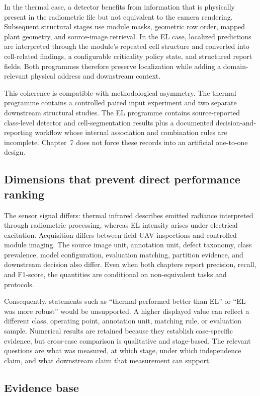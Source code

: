 \documentclass[12pt,a4paper]{report}
\begin{document}
In the thermal case, a detector benefits from information that is physically present in the radiometric file but not equivalent to the camera rendering. Subsequent structural stages use module masks, geometric row order, mapped plant geometry, and source-image retrieval. In the EL case, localized predictions are interpreted through the module's repeated cell structure and converted into cell-related findings, a configurable criticality policy state, and structured report fields. Both programmes therefore preserve localization while adding a domain-relevant physical address and downstream context.

This coherence is compatible with methodological asymmetry. The thermal programme contains a controlled paired input experiment and two separate downstream structural studies. The EL programme contains source-reported class-level detector and cell-segmentation results plus a documented decision-and-reporting workflow whose internal association and combination rules are incomplete. Chapter~7 does not force these records into an artificial one-to-one design.

\subsection{Dimensions that prevent direct performance ranking}

The sensor signal differs: thermal infrared describes emitted radiance interpreted through radiometric processing, whereas EL intensity arises under electrical excitation. Acquisition differs between field UAV inspections and controlled module imaging. The source image unit, annotation unit, defect taxonomy, class prevalence, model configuration, evaluation matching, partition evidence, and downstream decision also differ. Even when both chapters report precision, recall, and F1-score, the quantities are conditional on non-equivalent tasks and protocols.

Consequently, statements such as ``thermal performed better than EL'' or ``EL was more robust'' would be unsupported. A higher displayed value can reflect a different class, operating point, annotation unit, matching rule, or evaluation sample. Numerical results are retained because they establish case-specific evidence, but cross-case comparison is qualitative and stage-based. The relevant questions are what was measured, at which stage, under which independence claim, and what downstream claim that measurement can support.

\subsection{Evidence base}
\end{document}
